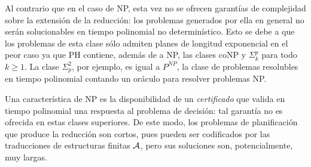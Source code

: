 Al contrario que en el caso de NP,
esta vez no se ofrecen garantías de complejidad sobre la extensión de la
reducción: los problemas \STRIPS generados por ella en general no serán
solucionables en tiempo polinomial no determinístico.
Esto se debe a que los problemas de esta clase sólo admiten planes
de longitud exponencial en el peor caso ya que PH contiene, además de a NP, las
clases coNP y $\Sigma^p_k$ para todo $k\geq 1$. La clase $\Sigma_p^2$, por
ejemplo, es igual a $P^{NP}$, la clase de problemas resolubles en tiempo
polinomial contando un oráculo para resolver problemas NP.

Una característica de NP es la 
disponibilidad de un \textit{certificado} que valida en tiempo polinomial una
respuesta al problema de decisión: tal garantía no es ofrecida en estas clases
superiores.
De este modo, los problemas de planificación que produce la reducción son
cortos, pues pueden ser codificados por las traducciones de estructuras finitas
$\mathcal{A}$, pero sus soluciones son, potencialmente, muy largas.


%

